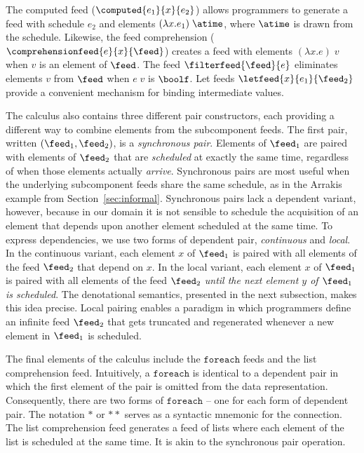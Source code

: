 The computed feed ($\computed{e_1}{x}{e_2}$) allows programmers to
generate a feed with schedule $e_2$ and elements $(\lambda x.e_1)\; \atime$,
where $\atime$ is drawn from the schedule. Likewise, the feed 
comprehension ($\comprehensionfeed{e}{x}{\feed}$) creates a
feed with elements $(\lambda x.e)\; v$ when $v$ is an element of $\feed$.
The feed
$\filterfeed{\feed}{e}$ eliminates elements $v$ from $\feed$ when
$e\; v$ is $\boolf$.  Let feeds $\letfeed{x}{e_1}{\feed_2}$
provide a convenient mechanism for binding intermediate values. 




The calculus also contains three different
pair constructors, each providing a different way to
combine elements from the subcomponent feeds.  The first pair, 
written $(\feed_1, \feed_2)$, is a {\em synchronous pair}.
Elements of $\feed_1$ are paired with elements of $\feed_2$
that are {\em scheduled} at exactly the same time, regardless of when those elements
actually {\em arrive}.  Synchronous pairs are most useful when the underlying
subcomponent feeds share the same schedule, as in the Arrakis example
from Section~\ref{sec:informal}.  Synchronous pairs lack a
dependent variant, however, because in our domain it is not sensible
to schedule the acquisition of an element that depends upon another
element scheduled at the same time.  To express dependencies, we 
use two forms of dependent pair, {\em continuous} and {\em local}.
In the continuous variant, each element $x$ of $\feed_1$ is paired 
with all elements of the feed $\feed_2$ that depend on $x$.  In the
local variant, each element $x$ of $\feed_1$
is paired with all elements of the feed $\feed_2$ {\em until the next
element $y$ of $\feed_1$ is scheduled}.  
The denotational semantics, presented
in the next subsection, makes this idea precise.  Local pairing
enables a paradigm in which programmers define an infinite feed $\feed_2$
that gets truncated and regenerated whenever a new element in $\feed_1$
is scheduled.


The final elements of the calculus include the $\mathtt{foreach}$ feeds
and the list comprehension feed.
Intuitively, a $\mathtt{foreach}$ is identical to a dependent pair in
which the first element of the pair is omitted from the data representation.
Consequently, there are two forms of $\mathtt{foreach}$ -- one for
each form of dependent pair.  The notation ${*}$ or ${**}$ serves as
a syntactic mnemonic for the connection.  The list comprehension
feed generates a feed of lists where each element of the list is
scheduled at the same time.  It is akin to the synchronous pair
operation. 


